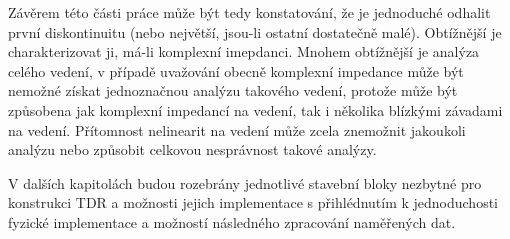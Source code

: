 Závěrem této části práce může být tedy konstatování, že je jednoduché odhalit první diskontinuitu (nebo největší, jsou-li ostatní dostatečně malé). Obtížnější je charakterizovat ji, má-li komplexní imepdanci. Mnohem obtížnější je analýza celého vedení, v případě uvažování obecně komplexní impedance může být nemožné získat jednoznačnou analýzu takového vedení, protože může být způsobena jak komplexní impedancí na vedení, tak i několika blízkými závadami na vedení. Přítomnost nelinearit na vedení může zcela znemožnit jakoukoli analýzu nebo způsobit celkovou nesprávnost takové analýzy.

V dalších kapitolách budou rozebrány jednotlivé stavební bloky nezbytné pro konstrukci \acrshort{TDR} a možnosti jejich implementace s přihlédnutím k jednoduchosti fyzické implementace a možností následného zpracování naměřených dat.